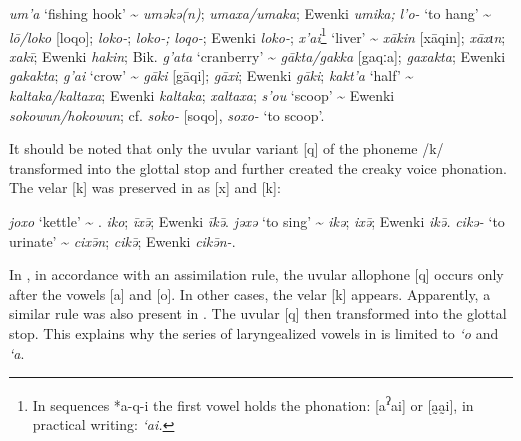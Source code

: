 \documentclass[output=paper,colorlinks,citecolor=brown]{langscibook}
\begin{document}
\ea
    \label{example7.15}
 \textit{um’a} ‘fishing hook’ {\textasciitilde}  \textit{um{ə}k{ə}(n)};  \textit{umaxa/umaka}; Ewenki \textit{umika;} 
\ex
    \label{example7.16}
 \textit{l’o-} ‘to hang’ {\textasciitilde}  \textit{lō/loko} [loqo];  \textit{loko-};  \textit{loko-;}  \textit{loqo-}; Ewenki \textit{loko-}; 
\ex
    \label{example7.17}
 \textit{x’ai}\footnote{In sequences *a-q-i the first vowel holds the phonation: [a\textsuperscript{{ʔ}}ai] or [a{̰}a{̰}i], in practical writing: \textit{‘ai.}} ‘liver’ {\textasciitilde}  \textit{x{ākin}} [x{āqin]};  \textit{x{āx}{ɩ}n};  \textit{xakī}; Ewenki \textit{hakin};
\ex
    \label{example7.18}
Bik.  \textit{g’ata} ‘cranberry’ {\textasciitilde}  \textit{gākta/gakka} [gaqːa];  \textit{gaxakta}; Ewenki \textit{gakakta}; 
\ex
    \label{example7.19}
 \textit{g’ai} ‘crow’ {\textasciitilde}  \textit{gāki} [gāqi];  \textit{gāxi}; Ewenki \textit{gāki};
\ex
    \label{example7.20}
 \textit{kakt’a} ‘half’ {\textasciitilde}  \textit{kaltaka/kaltaxa}; Ewenki \textit{kaltaka};  \textit{xaltaxa};
\ex
    \label{example7.21}
 \textit{s’ou} ‘scoop’ {\textasciitilde} Ewenki \textit{sokowun/hokowun}; cf.  \textit{soko-} [soqo],  \textit{soxo-} ‘to scoop’.
\z

It should be noted that only the uvular variant [q] of the phoneme /k/ transformed into the glottal stop and further created the creaky voice phonation. The velar [k] was preserved in  as [x] and [k]:

\ea
    \label{example7.22}
 \textit{joxo} ‘kettle’ {\textasciitilde} . \textit{iko};  \textit{īx\={ə}}; Ewenki \textit{īk\={ə}}.
\ex
    \label{example7.23}
 \textit{j{ə}x{ə}} ‘to sing’ {\textasciitilde}  \textit{ik{ə}};  \textit{ix\={ə}}; Ewenki \textit{ik\={ə}.}
\ex
    \label{example7.24}
 \textit{cik{ə}-} ‘to urinate’ {\textasciitilde}  \textit{cix\={ə}n};  \textit{cik\={ə}}; Ewenki \textit{cik\={ə}n-}.
\z

In , in accordance with an assimilation rule, the uvular allophone [q] occurs only after the vowels [a] and [o]. In other cases, the velar [k] appears. Apparently, a similar rule was also present in . The uvular [q] then transformed into the glottal stop. This explains why the series of laryngealized vowels in  is limited to \textit{‘o} and \textit{‘a}. 
\end{document}
